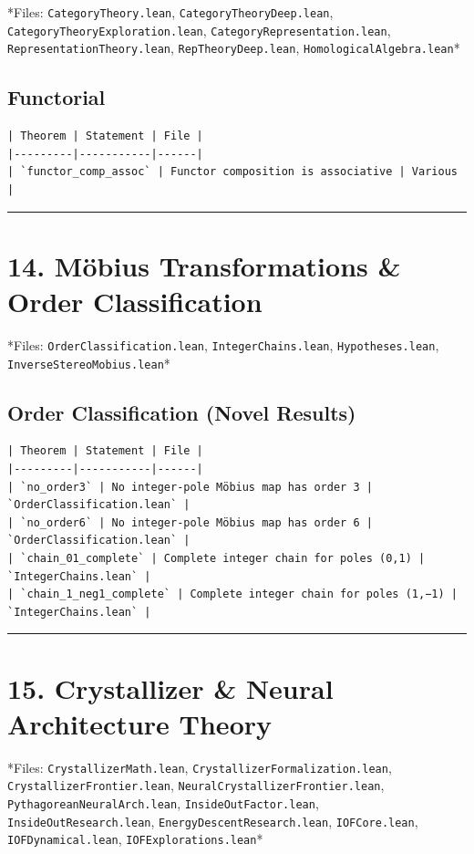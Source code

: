 \documentclass[12pt,a4paper,openany]{book}
\begin{document}
*Files: \texttt{CategoryTheory.lean}, \texttt{CategoryTheoryDeep.lean}, \texttt{CategoryTheoryExploration.lean}, \texttt{CategoryRepresentation.lean}, \texttt{RepresentationTheory.lean}, \texttt{RepTheoryDeep.lean}, \texttt{HomologicalAlgebra.lean}*

\subsection{Functorial}
\begin{verbatim}
| Theorem | Statement | File |
|---------|-----------|------|
| `functor_comp_assoc` | Functor composition is associative | Various |
\end{verbatim}

\bigskip\hrule\bigskip

\section{14. Möbius Transformations \& Order Classification}

*Files: \texttt{OrderClassification.lean}, \texttt{IntegerChains.lean}, \texttt{Hypotheses.lean}, \texttt{InverseStereoMobius.lean}*

\subsection{Order Classification (Novel Results)}
\begin{verbatim}
| Theorem | Statement | File |
|---------|-----------|------|
| `no_order3` | No integer-pole Möbius map has order 3 | `OrderClassification.lean` |
| `no_order6` | No integer-pole Möbius map has order 6 | `OrderClassification.lean` |
| `chain_01_complete` | Complete integer chain for poles (0,1) | `IntegerChains.lean` |
| `chain_1_neg1_complete` | Complete integer chain for poles (1,−1) | `IntegerChains.lean` |
\end{verbatim}

\bigskip\hrule\bigskip

\section{15. Crystallizer \& Neural Architecture Theory}

*Files: \texttt{CrystallizerMath.lean}, \texttt{CrystallizerFormalization.lean}, \texttt{CrystallizerFrontier.lean}, \texttt{NeuralCrystallizerFrontier.lean}, \texttt{PythagoreanNeuralArch.lean}, \texttt{InsideOutFactor.lean}, \texttt{InsideOutResearch.lean}, \texttt{EnergyDescentResearch.lean}, \texttt{IOFCore.lean}, \texttt{IOFDynamical.lean}, \texttt{IOFExplorations.lean}*
\end{document}
